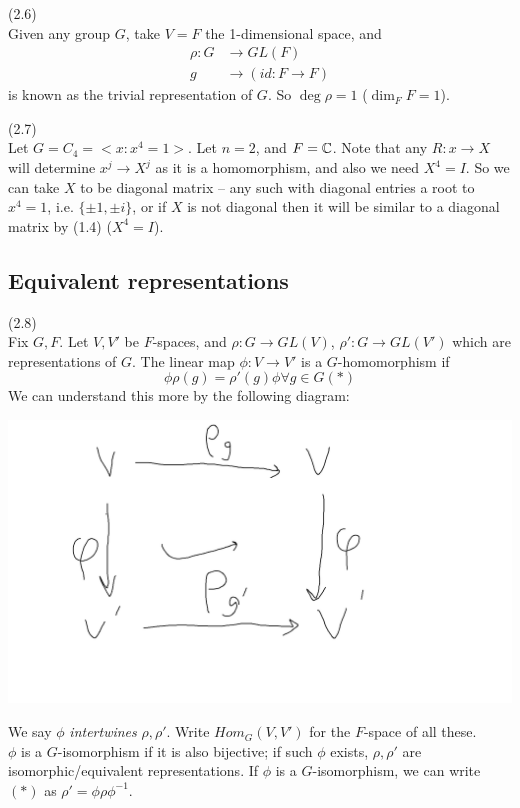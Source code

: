 \documentclass[a4paper]{article}
\begin{document}
\begin{eg} (2.6)\\
Given any group $G$, take $V=F$ the 1-dimensional space, and 
\begin{equation*}
\begin{aligned}
\rho:G &\to GL(F)\\
g &\to (id: F \to F)
\end{aligned}
\end{equation*}
is known as the trivial representation of $G$. So $\deg \rho = 1$ ($\dim_F F = 1$).
\end{eg}

\begin{eg} (2.7)\\
Let $G=C_4 = <x:x^4=1>$. Let $n=2$, and $F=\mathbb{C}$. Note that any $R:x \to X$ will determine $x^j \to X^j$ as it is a homomorphism, and also we need $X^4 = I$. So we can take $X$ to be diagonal matrix -- any such with diagonal entries a root to $x^4=1$, i.e. $\{\pm 1,\pm i\}$, or if $X$ is not diagonal then it will be similar to a diagonal matrix by (1.4) ($X^4=I$).
\end{eg}

\subsection{Equivalent representations}

\begin{defi} (2.8)\\
Fix $G,F$. Let $V,V'$ be $F$-spaces, and $\rho:G \to GL(V)$, $\rho': G \to GL(V')$ which are representations of $G$. The linear map $\phi: V \to V'$ is a $G$-homomorphism if $$\phi\rho(g) = \rho'(g)\phi \forall g \in G (*)$$ We can understand this more by the following diagram:

\includegraphics[scale=0.5]{image/Rep_01.png}

We say $\phi$ \emph{intertwines} $\rho,\rho'$. Write $Hom_G(V,V')$ for the $F$-space of all these.\\
$\phi$ is a $G$-isomorphism if it is also bijective; if such $\phi$ exists, $\rho,\rho'$ are isomorphic/equivalent representations. If $\phi$ is a $G$-isomorphism, we can write $(*)$ as $\rho' = \phi\rho\phi^{-1}$.
\end{defi}
\end{document}
